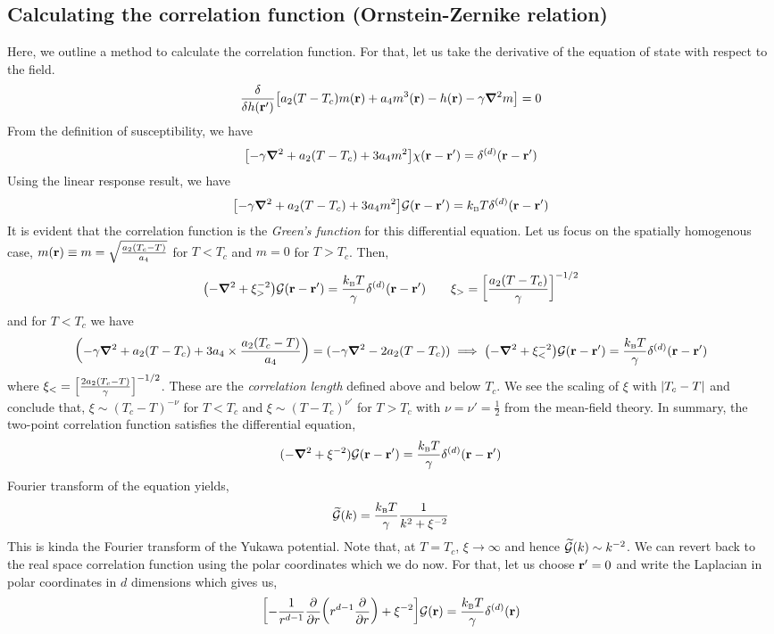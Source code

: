 \subsection{Calculating the correlation function (Ornstein-Zernike relation)}
Here, we outline a method to calculate the correlation function. For that, let us take the derivative of the equation of state with respect to the field. 
$$\frac{\delta}{\delta h(\vb{r}')}\qty[a_2(T-T_c) m(\vb{r}) + a_4 m^3(\vb{r}) - h(\vb{r}) - \gamma \grad^2 m] = 0 $$
From the definition of susceptibility, we have 
$$\qty[-\gamma \grad^2 + a_2(T-T_c) + 3a_4m^2]\chi(\vb{r}-\vb{r}') = \delta^{(d)}(\vb{r}-\vb{r}')$$
Using the linear response result, we have
$$\qty[-\gamma \grad^2 + a_2(T-T_c) + 3a_4m^2]\mathcal G(\vb{r}-\vb{r}') =k_{\text{\tiny B}} T \delta^{(d)}(\vb{r}-\vb{r}')$$
It is evident that the correlation function is the \textit{Green's function} for this differential equation. Let us focus on the spatially homogenous case, $m(\vb{r})\equiv m = \sqrt{\frac{a_2(T_c-T)}{a_4}}$ for $T<T_c$ and $m = 0$ for $T>T_c$. Then, 
$$\qty(-\grad^2+ \xi_{>}^{-2})\mathcal G(\vb{r}-\vb{r}') = \frac{k_{\text{\tiny B}} T}{\gamma}\delta^{(d)}(\vb{r}-\vb{r}')\qquad \xi_> = \qty[\frac{a_2(T-T_c)}{\gamma}]^{-1/2} $$
and for $T<T_c$ we have
$$\qty(-\gamma\grad^2 + a_2(T-T_c) + 3 a_4\times \frac{a_2(T_c -T)}{a_4})  =(-\gamma\grad^2 -2 a_2(T-T_c)) \implies \qty(-\grad^2 + \xi_{<}^{-2})\mathcal G(\vb{r}-\vb{r}')  = \frac{k_{\text{\tiny B}} T}{\gamma}\delta^{(d)}(\vb{r}-\vb{r}')$$
where $ \xi_{<} = \qty[\frac{2a_2(T_c-T)}{\gamma}]^{-1/2}$. These are the \textit{correlation length} defined above and below $T_c$. We see the scaling of $\xi$ with $\abs{T_c-T}$ and conclude that, 
$\xi \sim {(T_c-T)}^{-\nu}$ for $T<T_c$ and $\xi \sim (T-T_c)^{\nu'}$ for $T>T_c$ with $\nu = \nu' = \frac{1}{2}$ from the mean-field theory. In summary, the two-point correlation function satisfies the differential equation, 
$$(-\grad^2 + \xi^{-2})\mathcal G(\vb{r}-\vb{r}') = \frac{k_{\text{\tiny B}} T}{\gamma}\delta^{(d)}(\vb{r}-\vb{r}')$$
Fourier transform of the equation yields, 
\begin{equation}
    \widetilde{\mathcal G}(k) = \frac{k_{\text{\tiny B}} T}{\gamma} \frac{1}{k^2 + \xi^{-2}}
\end{equation}
 This is kinda the Fourier transform of the Yukawa potential. Note that, at $T=T_c$, $\xi\to \infty$ and hence $\widetilde{\mathcal G}(k) \sim k^{-2}$. We can revert back to the real space correlation function using the polar coordinates which we do now. For that, let us choose $\vb{r}'= 0$ and write the Laplacian in polar coordinates in $d$ dimensions which gives us, 
 \begin{equation}
   \qty[ -\frac{1}{r^{d-1}} \pdv{r}\qty(r^{d-1}\pdv{r}) + \xi^{-2} ] \mathcal G(\vb{r}) = \frac{k_{\text{\tiny B}} T}{\gamma} \delta^{(d)}(\vb{r})
 \end{equation}
